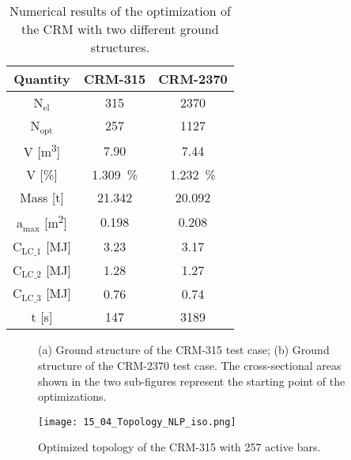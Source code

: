 \begin{table}
    \centering
    \begin{tabular}{ccc}
    \toprule
    \textbf{Quantity} & \textbf{CRM-315} & \textbf{CRM-2370} \\ \midrule
    N$_{\text{el}}$          & 315               & 2370               \\
    N$_{\text{opt}}$           & 257                  &  1127              \\
    V [\unit{\meter^3}]             &  7.90                 &  7.44             \\
    V [\unit{\%}]             &   \qty{1.309}{\%}                & \qty{1.232}{\%}               \\
    Mass [\unit{\tonne}]               &   21.342                & 20.092     \\
    a$_{\text{max}}$ [\unit{\meter^2}]           &  0.198                 & 0.208              \\
    C$_\text{LC\_1}$ [\unit{\mega \joule}]                &  3.23                 &  3.17              \\
    C$_\text{LC\_2}$ [\unit{\mega \joule}]                &   1.28                &  1.27              \\
    C$_\text{LC\_3}$ [\unit{\mega \joule}]                &   0.76                &  0.74              \\
    t [\unit{\second}]                & 147                  & 3189   \\ \bottomrule            
    \end{tabular}
    \caption{Numerical results of the optimization of the CRM with two different ground structures.}
    \label{tab:wing-res}
    \end{table}
    
    \begin{figure*}
        \centering
        \bigskip
        \caption{(a) Ground structure of the CRM-315 test case; (b) Ground structure of the CRM-2370 test case. The cross-sectional areas shown in the two sub-figures represent the starting point of the optimizations.}
        \label{fig:crm}
    \end{figure*}
    
    \begin{figure}
        \centering
        \texttt{[image: 15\_04\_Topology\_NLP\_iso.png]}
         \caption{Optimized topology of the CRM-315 with 257 active bars.}
        \label{fig:crm315}
    \end{figure}
    
